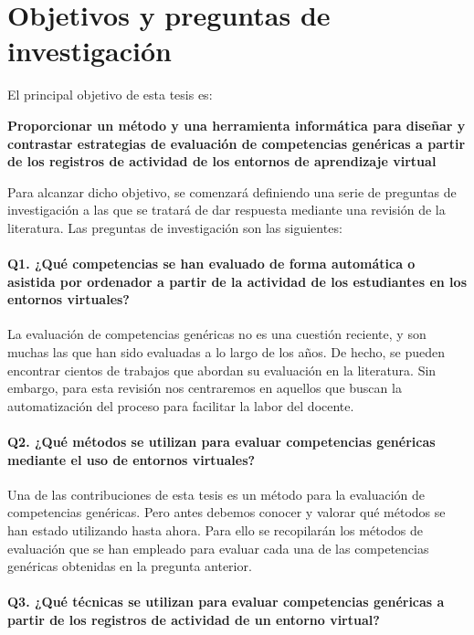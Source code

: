 
\section{Objetivos y preguntas de investigación}
\label{sec:objetivos}

El principal objetivo de esta tesis es:


\bigskip
\textbf{Proporcionar un método y una herramienta informática para diseñar y contrastar estrategias de evaluación de competencias genéricas a partir de los registros de actividad de los entornos de aprendizaje virtual}
\bigskip

Para alcanzar dicho objetivo, se comenzará definiendo una serie de preguntas de investigación a las que se tratará de dar respuesta mediante una revisión de la literatura. Las preguntas de investigación son las siguientes:

\paragraph*{Q1. ¿Qué competencias se han evaluado de forma automática o asistida por ordenador a partir de la actividad de los estudiantes en los entornos virtuales?}

La evaluación de competencias genéricas no es una cuestión reciente, y son muchas las que han sido evaluadas a lo largo de los años. De hecho, se pueden encontrar cientos de trabajos que abordan su evaluación en la literatura. Sin embargo, para esta revisión nos centraremos en aquellos que buscan la automatización del proceso para facilitar la labor del docente.

\paragraph*{Q2. ¿Qué métodos se utilizan para evaluar competencias genéricas mediante el uso de entornos virtuales?}

Una de las contribuciones de esta tesis es un método para la evaluación de competencias genéricas. Pero antes debemos conocer y valorar qué métodos se han estado utilizando hasta ahora. Para ello se recopilarán los métodos de evaluación que se han empleado para evaluar cada una de las competencias genéricas obtenidas en la pregunta anterior.

\paragraph*{Q3. ¿Qué técnicas se utilizan para evaluar competencias genéricas a partir de los registros de actividad de un entorno virtual?}

